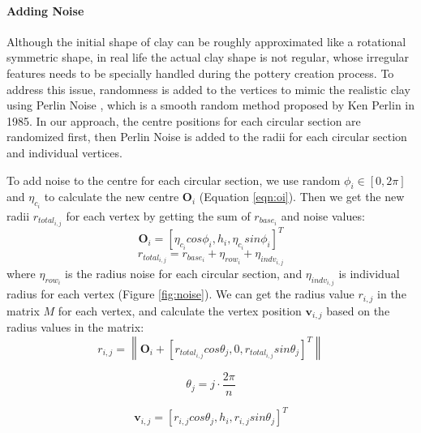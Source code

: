 \documentclass{svjour3}                     %
\begin{document}
\paragraph{Adding Noise} Although the initial shape of clay can be roughly approximated like a rotational symmetric shape, in real life the actual clay shape is not regular, whose irregular features needs to be specially handled during the pottery creation process. To address this issue, randomness is added to the vertices to mimic the realistic clay using Perlin Noise \cite{Perlin1985An}, which is a smooth random method proposed by Ken Perlin in 1985.
In our approach, the centre positions for each circular section are randomized first, then Perlin Noise is added to the radii for each circular section and individual vertices.

To add noise to the centre for each circular section, we use random $\phi_{i} \in [0, 2\pi]$ and $\eta_{c_{i}}$ to calculate the new centre $\mathbf{O}_{i}$ (Equation \ref{eqn:oi}). Then we get the new radii $r_{total_{i,j}}$ for each vertex by getting the sum of $r_{base_{i}}$ and noise values:
\begin{equation}
\label{eqn:oi}
\mathbf{O}_{i} = \left[\eta_{c_{i}}cos\phi_{i}, h_{i}, \eta_{c_{i}}sin\phi_{i}\right]^T
\end{equation}
\begin{equation}
r_{total_{i,j}} = r_{base_{i}} + \eta_{row_{i}} + \eta_{indv_{i,j}}
\end{equation}
where $\eta_{row_{i}}$ is the radius noise for each circular section, and $\eta_{indv_{i,j}}$ is individual radius for each vertex (Figure \ref{fig:noise}). We can get the radius value $r_{i,j}$ in the matrix $M$ for each vertex, and calculate the vertex position $\mathbf{v}_{i,j}$ based on the radius values in the matrix:
\begin{equation}
r_{i,j} = \left\|
\mathbf{O}_{i} + \left[ r_{total_{i,j}} cos \theta_{j},
0,
r_{total_{i,j}} sin \theta_{j}
\right]^T
\right\| 
\end{equation}

\begin{equation}
\theta_{j} = j \cdot \frac{2\pi}{n}
\end{equation}

\begin{equation}
\label{eqn:v}
\mathbf{v}_{i,j} =
\left[r_{i,j}  cos \theta_{j},
h_{i},
r_{i,j} sin \theta_{j}\right]^T
\end{equation}
\end{document}
